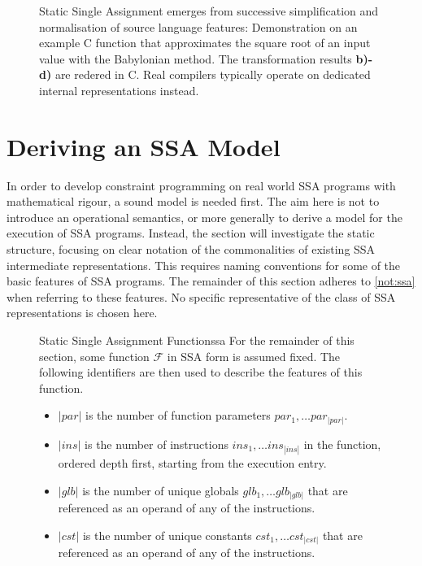 \begin{figure}[p]
    
    \caption{Static Single Assignment emerges from successive simplification
             and normalisation of source language features: 
             Demonstration on an example C function that approximates the
             square root of an input value with the Babylonian method.
             The transformation results {\bf b)-d)} are redered in C.
             Real compilers typically operate on
             dedicated internal representations instead.}
    \label{ssaexample}
\end{figure}

\section{Deriving an SSA Model}

    In order to develop constraint programming on real world SSA programs with
    mathematical rigour, a sound model is needed first.
    The aim here is not to introduce an operational semantics, or more
    generally to derive a model for the execution of SSA programs.
    Instead, the section will investigate the static structure, focusing on
    clear notation of the commonalities of existing SSA intermediate
    representations.
    This requires naming conventions for some of the basic features of
    SSA programs.
    The remainder of this section adheres to \autoref{not:ssa} when referring to
    these features.
    No specific representative of the class of SSA representations is chosen
    here.

\begin{figure}[h]
\begin{notation}{Static Single Assignment Function}{ssa}
    For the remainder of this section, some function $\mathcal F$ in SSA form is
    assumed fixed. 
    The following identifiers are then used to describe the features of this
    function.

    \begin{itemize}
    \item $|par|$ is the number of function parameters
          $par_1,\dots par_{|par|}$.
    \item $|ins|$ is the number of instructions $ins_1,\dots ins_{|ins|}$ in the
          function, ordered depth first, starting from the execution entry.
    \item $|glb|$ is the number of unique globals $glb_1,\dots glb_{|glb|}$ that
          are referenced as an operand of any of the instructions.
    \item $|cst|$ is the number of unique constants $cst_1,\dots cst_{|cst|}$
          that are referenced as an operand of any of the instructions.
    \end{itemize}
\end{notation}
\end{figure}


